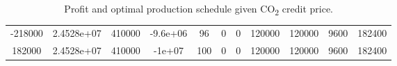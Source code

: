 \documentclass[twocolumn]{article}
\begin{document}
\begin{landscape}
\begin{table}[H]
\begin{tabular}{ccccccccccc}
-218000      & 2.4528e+07       & 410000            & -9.6e+06                & 96       & 0      & 0     & 120000  & 120000 & 9600  & 182400       \\
182000       & 2.4528e+07       & 410000            & -1e+07                  & 100      & 0      & 0     & 120000  & 120000 & 9600  & 182400      \\ \hline 
\end{tabular}
        \caption{Profit and optimal production schedule given CO\textsubscript{2} credit price.\label{table:carbon_credit}}
    \end{table}
    
    
\end{landscape}
\restoregeometry

      
\begin{landscape}

%
%    


\end{landscape}
\end{document}
